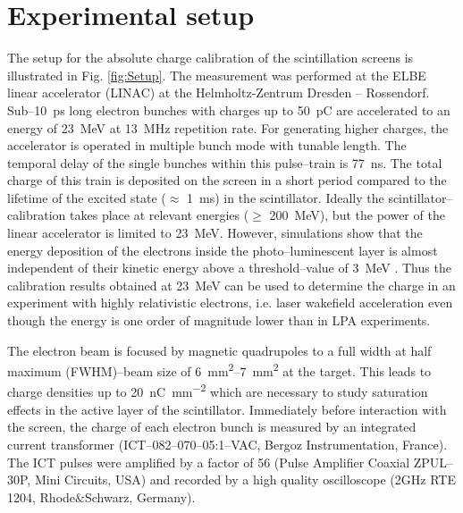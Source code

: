 \documentclass[%
reprint,
amsmath,
amssymb,
aip,
rsi, 
numerical,
floatfix,
]{revtex4-1}
\newcommand{\myCite}[1]{\textcolor{blue}{\cite{#1}}}
\begin{document}
\section{\label{Set} Experimental setup}

The setup for the absolute charge calibration of the scintillation screens is illustrated in Fig. \ref{fig:Setup}.
The measurement was performed at the ELBE linear accelerator (LINAC) at the Helmholtz-Zentrum Dresden -- Rossendorf. 
Sub--\SI{10}{\pico\second} long electron bunches with charges up to \SI{50}{\pico\coulomb} are accelerated to an energy of \SI{23}{\mega\electronvolt} at \SI{13}{\mega\hertz} repetition rate. 
For generating higher charges, the accelerator is operated in multiple bunch mode with tunable length. 
The temporal delay of the single bunches within this pulse--train is \SI{77}{\nano\second}. 
The total charge of this train is deposited on the screen in a short period compared to the lifetime of the excited state ($\approx$ \SI{1}{\milli\second}) in the scintillator\myCite{Morlotti1997}.
Ideally the scintillator--calibration takes place at relevant energies ($\geq$ \SI{200}{\mega\electronvolt}), but the power of the linear accelerator is limited to \SI{23}{\mega\electronvolt}.
However, simulations show that the energy deposition of the electrons inside the photo--luminescent layer is almost independent of their kinetic energy above a threshold--value of \SI{3}{\mega\electronvolt} \myCite{Hidding2007,Glinec2006,Masuda2008}.
Thus the calibration results obtained at \SI{23}{\mega\electronvolt} can be used to determine the charge in an experiment with highly relativistic electrons, i.e. laser wakefield acceleration even though the energy is one order of  magnitude lower than in LPA experiments. 

The electron beam is focused by magnetic quadrupoles to a full width at half maximum (FWHM)--beam size of \SIrange{6}{7}{\milli\metre^2} at the target.
This leads to charge densities up to \SI[per-mode=symbol]{20}{\nano\coulomb \per \square\milli\meter} which are necessary to study saturation effects in the active layer of the scintillator.
Immediately before interaction with the screen, the charge of each electron bunch is measured by an integrated current transformer (ICT--082--070--05:1--VAC, Bergoz Instrumentation, France). 
The ICT pulses were amplified by a factor of 56 (Pulse Amplifier Coaxial ZPUL--30P, Mini Circuits, USA) and recorded by a high quality oscilloscope (2GHz RTE 1204, Rhode$\&$Schwarz, Germany).
\end{document}
